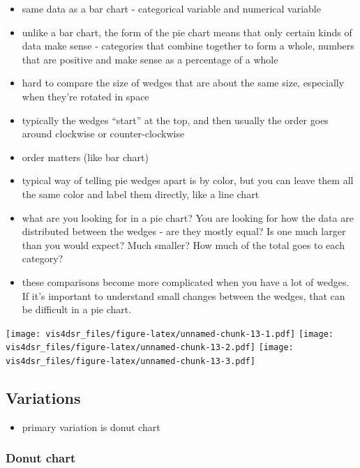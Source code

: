 \documentclass[
]{krantz}
\providecommand{\tightlist}{%
  \setlength{\itemsep}{0pt}\setlength{\parskip}{0pt}}
\begin{document}
\begin{itemize}
\tightlist
\item
  same data as a bar chart - categorical variable and numerical variable
\item
  unlike a bar chart, the form of the pie chart means that only certain kinds
  of data make sense - categories that combine together to form a whole, numbers that
  are positive and make sense as a percentage of a whole
\item
  hard to compare the size of wedges that are about the same size, especially
  when they're rotated in space
\item
  typically the wedges ``start'' at the top, and then usually the order goes around
  clockwise or counter-clockwise
\item
  order matters (like bar chart)
\item
  typical way of telling pie wedges apart is by color, but you can leave them all
  the same color and label them directly, like a line chart
\item
  what are you looking for in a pie chart? You are looking for how the data are
  distributed between the wedges - are they mostly equal? Is one much larger than
  you would expect? Much smaller? How much of the total goes to each category?
\item
  these comparisons become more complicated when you have a lot of wedges. If it's
  important to understand small changes between the wedges, that can be difficult
  in a pie chart.
\end{itemize}

\texttt{[image: vis4dsr\_files/figure-latex/unnamed-chunk-13-1.pdf]} \texttt{[image: vis4dsr\_files/figure-latex/unnamed-chunk-13-2.pdf]} \texttt{[image: vis4dsr\_files/figure-latex/unnamed-chunk-13-3.pdf]}

\hypertarget{variations-3}{%
\subsection{Variations}\label{variations-3}}

\begin{itemize}
\tightlist
\item
  primary variation is donut chart
\end{itemize}

\hypertarget{donut-chart}{%
\subsubsection{Donut chart}\label{donut-chart}}
\end{document}

